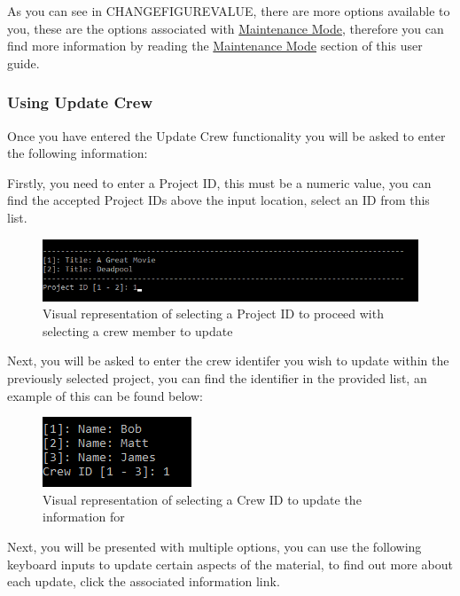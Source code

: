 \documentclass[
  english,
  a4paper,
,tablecaptionabove
]{scrartcl}
\begin{document}
As you can see in CHANGEFIGUREVALUE, there are more options available to
you, these are the options associated with
\protect\hyperlink{using-maintenance-mode}{Maintenance Mode}, therefore
you can find more information by reading the
\protect\hyperlink{using-maintenance-mode}{Maintenance Mode} section of
this user guide.

\hypertarget{using-update-crew}{%
\subsubsection{Using Update Crew}\label{using-update-crew}}

Once you have entered the Update Crew functionality you will be asked to
enter the following information:

Firstly, you need to enter a Project ID, this must be a numeric value,
you can find the accepted Project IDs above the input location, select
an ID from this list.

\begin{figure}
\centering
\includegraphics{images/user-guide/maintenance-mode/update-project-select-id.png}
\caption{Visual representation of selecting a Project ID to proceed with
selecting a crew member to update}
\end{figure}

Next, you will be asked to enter the crew identifer you wish to update
within the previously selected project, you can find the identifier in
the provided list, an example of this can be found below:

\begin{figure}
\centering
\includegraphics{images/user-guide/maintenance-mode/update-project-crew-select-crew-id.png}
\caption{Visual representation of selecting a Crew ID to update the
information for}
\end{figure}

Next, you will be presented with multiple options, you can use the
following keyboard inputs to update certain aspects of the material, to
find out more about each update, click the associated information link.
\end{document}
